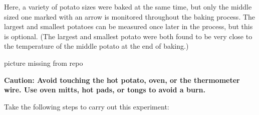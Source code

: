 \documentclass{ximera}
\begin{document}
Here, a variety of potato sizes were baked at the same time, but only the middle sized one marked with an arrow is monitored throughout the baking process.  The largest and smallest potatoes can be measured once later in the process, but this is optional.  (The largest and smallest potato were both found to be very close to the temperature of the middle potato at the end of baking.)
 
\begin{image}
picture missing from repo
\end{image}
 
\textbf{Caution: Avoid touching the hot potato, oven, or the thermometer wire.  Use oven mitts, hot pads, or tongs to avoid a burn.}
 
Take the following steps to carry out this experiment:
\end{document}
